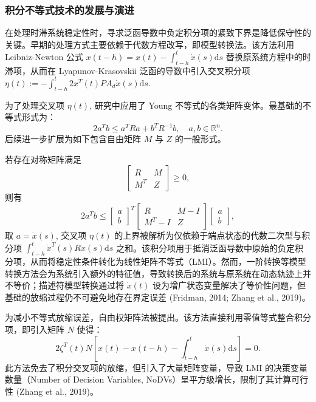 \documentclass[a4paper, 12pt, oneside]{article}
\theoremstyle{cn_theorem}
\begin{document}
\subsubsection{积分不等式技术的发展与演进}
在处理时滞系统稳定性时，寻求泛函导数中负定积分项的紧致下界是降低保守性的关键。早期的处理方式主要依赖于代数方程改写，即模型转换法。该方法利用 Leibniz-Newton 公式 $x(t-h) = x(t) - \int_{t-h}^t \dot{x}(s)\mathrm{d}s$ 替换原系统方程中的时滞项，从而在 Lyapunov-Krasovskii 泛函的导数中引入交叉积分项 $\eta(t) := -\int_{t-h}^t 2x^T(t) P A_d \dot{x}(s)\mathrm{d}s$.

为了处理交叉项 $\eta(t)$, 研究中应用了 Young 不等式的各类矩阵变体。最基础的不等式形式为：
\begin{equation*}
    2a^T b \le a^T R a + b^T R^{-1} b, \quad a, b \in \mathbb{R}^n.
\end{equation*}
后续进一步扩展为如下包含自由矩阵 $M$ 与 $Z$ 的一般形式。

若存在对称矩阵满足
\begin{equation*}
    \begin{bmatrix} R & M \\ M^T & Z \end{bmatrix} \ge 0,
\end{equation*}
则有
\begin{equation*}
    2a^T b \le \begin{bmatrix} a \\ b \end{bmatrix}^T \begin{bmatrix} R & M-I \\ M^T-I & Z \end{bmatrix} \begin{bmatrix} a \\ b \end{bmatrix},
\end{equation*}
取 $a = \dot{x}(s)$, 交叉项 $\eta(t)$ 的上界被解析为仅依赖于端点状态的代数二次型与积分项 $\int_{t-h}^t \dot{x}^T(s) R \dot{x}(s)\mathrm{d}s$ 之和。该积分项用于抵消泛函导数中原始的负定积分项，从而将稳定性条件转化为线性矩阵不等式（LMI）。然而，一阶转换等模型转换方法会为系统引入额外的特征值，导致转换后的系统与原系统在动态轨迹上并不等价；描述符模型转换通过将 $\dot{x}(t)$ 设为增广状态变量解决了等价性问题，但基础的放缩过程仍不可避免地存在界定误差 (Fridman, 2014; Zhang et al., 2019)。

为减小不等式放缩误差，自由权矩阵法被提出。该方法直接利用零值等式整合积分项，即引入矩阵 $N$ 使得：
\begin{equation*}
    2\zeta^T(t) N \left[ x(t) - x(t-h) - \int_{t-h}^t \dot{x}(s)\mathrm{d}s \right] = 0.
\end{equation*}
此方法免去了积分交叉项的放缩，但引入了大量矩阵变量，导致 LMI 的决策变量数量（Number of Decision Variables, NoDVs）呈平方级增长，限制了其计算可行性 (Zhang et al., 2019)。
\end{document}
